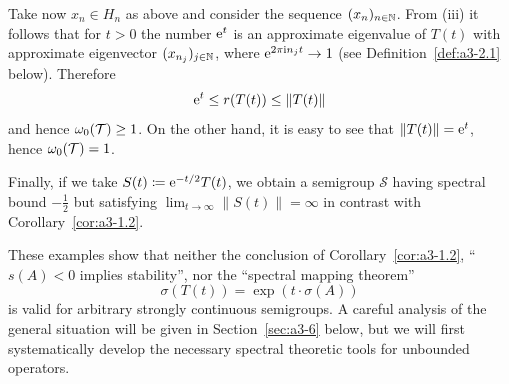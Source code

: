 Take now $x_{n} \in H_{n}$ as above and consider the sequence $(x_{n})_{n \in \mathbb{N}}$.
From (iii) it follows that for $t > 0$ the number $\mathrm{e}^{t}$ is an approximate eigenvalue of\/ $T(t)$ with approximate eigenvector $(x_{n_{j}})_{j \in \mathbb{N}}$, where $\mathrm{e}^{2\pi\mathrm{i} n_{j}t} \to 1$ (see Definition~\ref{def:a3-2.1} below).
Therefore 
%
\[
	 \eu^{t} \leq r(T(t)) \leq \|T(t)\|
\]
%
and hence $\omega_{0}(\TT) \geq 1$.
On the other hand, it is easy to see that $\|T(t)\| = \mathrm{e}^{t}$, hence $\omega_{0}(\mathcal{T}) = 1$.


Finally, if we take $S(t) \coloneq \mathrm{e}^{-t/2}T(t)$, we obtain a semigroup $\mathcal{S}$ 
having spectral bound $-\frac{1}{2}$ but satisfying $\lim_{t \to \infty} \|S(t)\| = \infty$ in contrast with Corollary~\ref{cor:a3-1.2}.

These examples show that neither the conclusion of Corollary~\ref{cor:a3-1.2}, \ie \enquote{$s(A) < 0$ implies stability}, nor the \enquote{spectral mapping theorem}
\[
    \sigma(T(t)) = \exp(t\cdot\sigma(A))
\]
is valid for arbitrary strongly continuous semigroups.
A careful analysis of the general situation will be given in Section~\ref{sec:a3-6} below, but we will first systematically develop the necessary spectral theoretic tools for unbounded operators.
